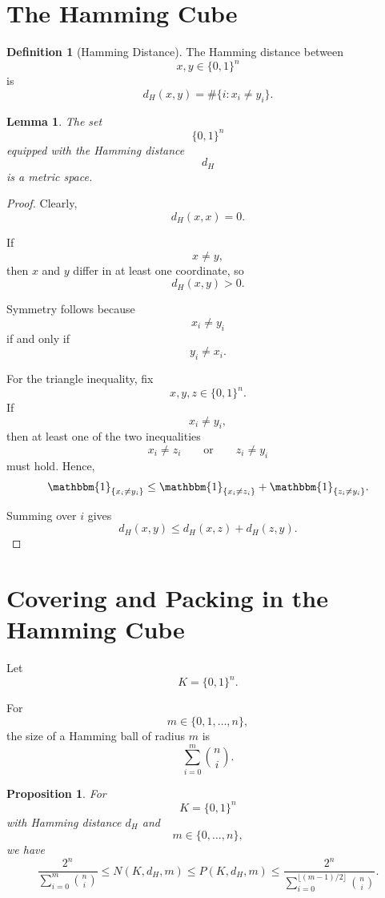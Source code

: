 \documentclass[12pt,oneside]{book}
\numberwithin{equation}{section}
\theoremstyle{definition}
\newtheorem{definition}{Definition}[section]
\theoremstyle{plain}
\newtheorem{lemma}{Lemma}[section]
\newtheorem{proposition}{Proposition}[section]
\theoremstyle{remark}
\newcommand{\ind}{\mathbbm{1}}
\begin{document}
\section{The Hamming Cube}

\begin{definition}[Hamming Distance]
The Hamming distance between
\[
x,y\in\{0,1\}^n
\]
is
\[
d_H(x,y)
=
\#\{i:x_i\neq y_i\}.
\]
\end{definition}

\begin{lemma}
The set
\[
\{0,1\}^n
\]
equipped with the Hamming distance
\[
d_H
\]
is a metric space.
\end{lemma}

\begin{proof}
Clearly,
\[
d_H(x,x)=0.
\]

If
\[
x\neq y,
\]
then $x$ and $y$ differ in at least one coordinate, so
\[
d_H(x,y)>0.
\]

Symmetry follows because
\[
x_i\neq y_i
\]
if and only if
\[
y_i\neq x_i.
\]

For the triangle inequality, fix
\[
x,y,z\in\{0,1\}^n.
\]
If
\[
x_i\neq y_i,
\]
then at least one of the two inequalities
\[
x_i\neq z_i
\qquad\text{or}\qquad
z_i\neq y_i
\]
must hold. Hence,
\[
\ind_{\{x_i\neq y_i\}}
\leq
\ind_{\{x_i\neq z_i\}}
+
\ind_{\{z_i\neq y_i\}}.
\]

Summing over $i$ gives
\[
d_H(x,y)
\leq
d_H(x,z)+d_H(z,y).
\]
\end{proof}

\section{Covering and Packing in the Hamming Cube}

Let
\[
K=\{0,1\}^n.
\]

For
\[
m\in\{0,1,\dots,n\},
\]
the size of a Hamming ball of radius $m$ is
\[
\sum_{i=0}^m \binom{n}{i}.
\]

\begin{proposition}
For
\[
K=\{0,1\}^n
\]
with Hamming distance $d_H$ and
\[
m\in\{0,\dots,n\},
\]
we have
\[
\frac{2^n}{\sum_{i=0}^m \binom{n}{i}}
\leq
N(K,d_H,m)
\leq
P(K,d_H,m)
\leq
\frac{2^n}{\sum_{i=0}^{\lfloor (m-1)/2\rfloor}\binom{n}{i}}.
\]
\end{proposition}
\end{document}
